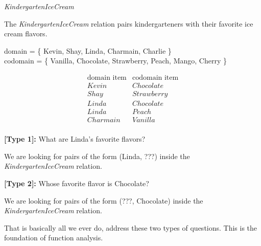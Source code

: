\documentclass{ximera}
\begin{document}
\begin{example} \textit{KindergartenIceCream} 

The \textit{KindergartenIceCream} relation pairs kindergarteners with their favorite ice cream flavors.

domain = \{ Kevin, Shay, Linda, Charmain, Charlie \}  \\
codomain = \{ Vanilla, Chocolate, Strawberry, Peach, Mango, Cherry \} 

\[
\begin{array}{l|l}
    \text{domain item}      & \text{codomain item}      \\ \hline
    Kevin   &  Chocolate \\
    Shay   & Strawberry \\
    Linda  &  Chocolate \\
    Linda  &  Peach \\
    Charmain &  Vanilla \\ 
\end{array}
\]


\begin{question}

\textbf{[Type 1]:} What are Linda's favorite flavors? 

\begin{selectAll}
\end{selectAll}
\end{question}

We are looking for pairs of the form (Linda, ???) inside the \textit{KindergartenIceCream} relation.


\begin{question}

\textbf{[Type 2]:} Whose favorite flavor is Chocolate? 

\begin{selectAll}

\end{selectAll}
\end{question}

We are looking for pairs of the form (???, Chocolate) inside the \textit{KindergartenIceCream} relation.



\end{example} 

That is basically all we ever do, address these two types of questions. This is the foundation of function analysis.
\end{document}
